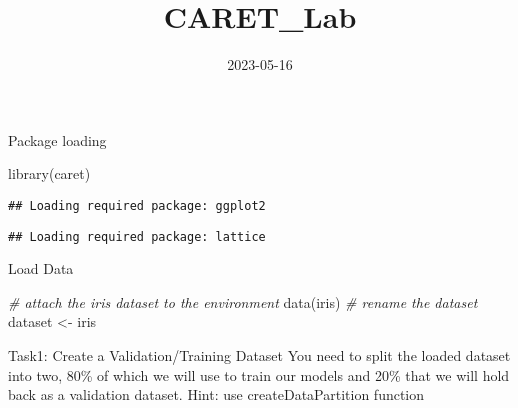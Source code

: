 \documentclass[
]{article}
\title{CARET\_Lab}
\author{}
\date{\vspace{-2.5em}2023-05-16}
\newenvironment{Shaded}{\begin{snugshade}}{\end{snugshade}}
\newcommand{\AttributeTok}[1]{\textcolor[rgb]{0.77,0.63,0.00}{#1}}
\newcommand{\CommentTok}[1]{\textcolor[rgb]{0.56,0.35,0.01}{\textit{#1}}}
\newcommand{\ConstantTok}[1]{\textcolor[rgb]{0.00,0.00,0.00}{#1}}
\newcommand{\DecValTok}[1]{\textcolor[rgb]{0.00,0.00,0.81}{#1}}
\newcommand{\FloatTok}[1]{\textcolor[rgb]{0.00,0.00,0.81}{#1}}
\newcommand{\FunctionTok}[1]{\textcolor[rgb]{0.00,0.00,0.00}{#1}}
\newcommand{\NormalTok}[1]{#1}
\newcommand{\OtherTok}[1]{\textcolor[rgb]{0.56,0.35,0.01}{#1}}
\newcommand{\SpecialCharTok}[1]{\textcolor[rgb]{0.00,0.00,0.00}{#1}}
\begin{document}
\maketitle

Package loading

\begin{Shaded}
\begin{Highlighting}[]
\FunctionTok{library}\NormalTok{(caret)}
\end{Highlighting}
\end{Shaded}

\begin{verbatim}
## Loading required package: ggplot2
\end{verbatim}

\begin{verbatim}
## Loading required package: lattice
\end{verbatim}

Load Data

\begin{Shaded}
\begin{Highlighting}[]
\CommentTok{\# attach the iris dataset to the environment}
\FunctionTok{data}\NormalTok{(iris)}
\CommentTok{\# rename the dataset}
\NormalTok{dataset }\OtherTok{\textless{}{-}}\NormalTok{ iris}
\end{Highlighting}
\end{Shaded}

Task1: Create a Validation/Training Dataset You need to split the loaded
dataset into two, 80\% of which we will use to train our models and 20\%
that we will hold back as a validation dataset. Hint: use
createDataPartition function

\begin{Shaded}
\end{Shaded}
\end{document}
